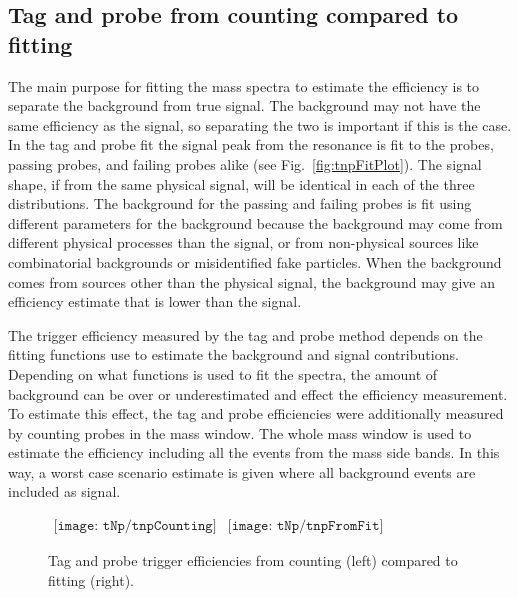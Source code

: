     \subsection{Tag and probe from counting compared to fitting}
      The main purpose for fitting the mass spectra to estimate the efficiency
        is to separate the background from true signal. 
      The background may not have the same efficiency as the signal, so 
        separating the two is important if this is the case.
      In the tag and probe fit the signal peak from the \JPsi{} resonance
        is fit to the probes, passing probes, and failing probes alike (see
        Fig.~\ref{fig:tnpFitPlot}). 
      The signal shape, if from the same physical signal, will be 
        identical in each of the three distributions. 
      The background for the passing and failing probes is fit using 
        different parameters for the background because the background
        may come from different physical processes than the signal, or from 
        non-physical sources like combinatorial backgrounds or misidentified
        fake particles.
      When the background comes from sources other than the physical signal,
        the background may give an efficiency estimate that is lower than
        the signal. 
  
      The trigger efficiency measured by the tag and probe method depends on
        the fitting functions use to estimate the background and signal 
        contributions. 
      Depending on what functions is used to fit the spectra, the amount of
        background can be over or underestimated and effect the efficiency 
        measurement.
      To estimate this effect, the tag and probe efficiencies were additionally
        measured by counting probes in the \JPsi{} mass window. 
      The whole mass window is used to estimate the efficiency including all 
        the events from the mass side bands.
      In this way, a worst case scenario estimate is given where all background
        events are included as signal. 
      \begin{figure}[!Hhbt]
        \centering
        $ \begin{array}{cc}
          \texttt{[image: tNp/tnpCounting]} &
          \texttt{[image: tNp/tnpFromFit]}
        \end{array} $ 
        \caption{Tag and probe trigger efficiencies from counting (left) 
          compared to fitting (right).}
        \label{fig:tnpCntVFit}
      \end{figure}
  
